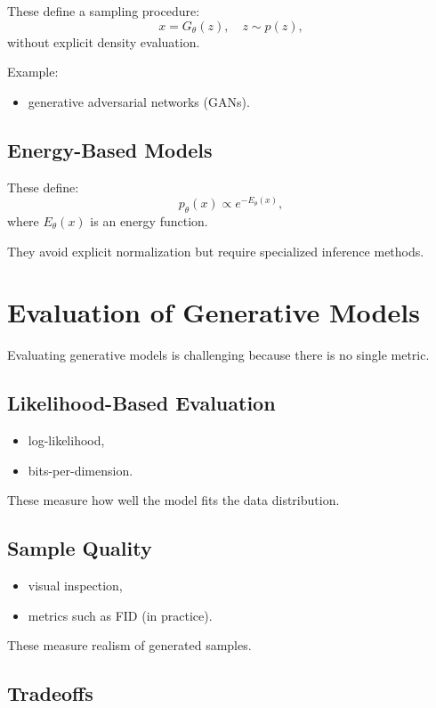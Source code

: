 These define a sampling procedure:
\[
x = G_\theta(z), \quad z \sim p(z),
\]
without explicit density evaluation.

Example:
\begin{itemize}
    \item generative adversarial networks (GANs).
\end{itemize}

\subsection{Energy-Based Models}

These define:
\[
p_\theta(x) \propto e^{-E_\theta(x)},
\]
where $E_\theta(x)$ is an energy function.

They avoid explicit normalization but require specialized inference methods.

\section{Evaluation of Generative Models}

Evaluating generative models is challenging because there is no single metric.

\subsection{Likelihood-Based Evaluation}

\begin{itemize}
    \item log-likelihood,
    \item bits-per-dimension.
\end{itemize}

These measure how well the model fits the data distribution.

\subsection{Sample Quality}

\begin{itemize}
    \item visual inspection,
    \item metrics such as FID (in practice).
\end{itemize}

These measure realism of generated samples.

\subsection{Tradeoffs}

